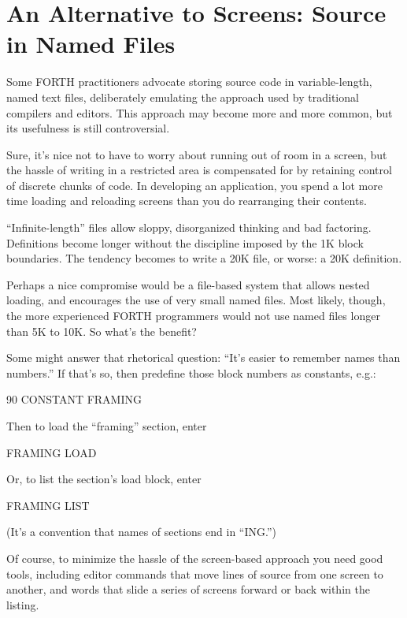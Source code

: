 \section{An Alternative to Screens: Source in Named Files}

Some FORTH practitioners advocate storing source code in variable-length,
named text files, deliberately emulating the approach used by
traditional compilers and editors.  This approach may become more and
more common, but its usefulness is still controversial.

Sure, it's nice not to have to worry about running out of room in a
screen, but the hassle of writing in a restricted area is compensated for by
retaining control of discrete chunks of code.  In developing an application,
you spend a lot more time loading and reloading screens than you do rearranging
their contents.

``Infinite-length'' files allow sloppy, disorganized thinking and bad
factoring.  Definitions become longer without the discipline imposed by
the 1K block boundaries.  The tendency becomes to write a 20K file, or
worse: a 20K definition.

Perhaps a nice compromise would be a file-based system that allows
nested loading, and encourages the use of very small named files.  Most
likely, though, the more experienced FORTH programmers would not
use named files longer than 5K to 10K.  So what's the benefit?

Some might answer that rhetorical question: ``It's easier to remember
names than numbers.'' If that's so, then predefine those block
numbers as constants, e.g.:
\begin{Code}
90 CONSTANT FRAMING
\end{Code}
Then to load the ``framing'' section, enter
\begin{Code}
FRAMING LOAD
\end{Code}
Or, to list the section's load block, enter
\begin{Code}
FRAMING LIST
\end{Code}
(It's a convention that names of sections end in ``ING.'')

Of course, to minimize the hassle of the screen-based approach you
need good tools, including editor commands that move lines of source
from one screen to another, and words that slide a series of screens forward
or back within the listing.

